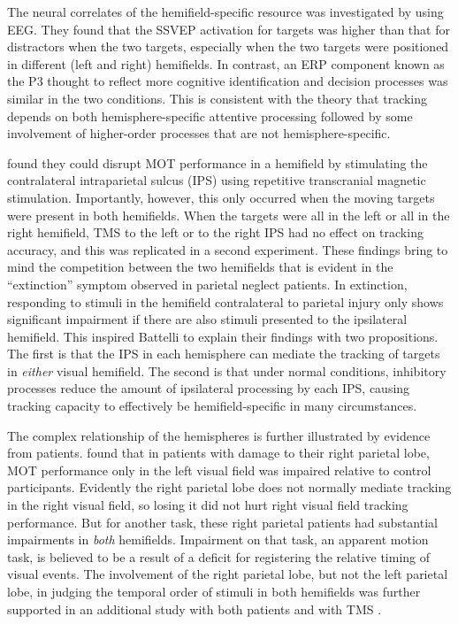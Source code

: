 \documentclass[
]{book}
\begin{document}
The neural correlates of the hemifield-specific resource was investigated by \citet{stormerWithinhemifieldCompetitionEarly2014} using EEG. They found that the SSVEP activation for targets was higher than that for distractors when the two targets, especially when the two targets were positioned in different (left and right) hemifields. In contrast, an ERP component known as the P3 thought to reflect more cognitive identification and decision processes was similar in the two conditions. This is consistent with the theory that tracking depends on both hemisphere-specific attentive processing followed by some involvement of higher-order processes that are not hemisphere-specific.

\citet{battelliRoleParietalLobe2009} found they could disrupt MOT performance in a hemifield by stimulating the contralateral intraparietal sulcus (IPS) using repetitive transcranial magnetic stimulation. Importantly, however, this only occurred when the moving targets were present in both hemifields. When the targets were all in the left or all in the right hemifield, TMS to the left or to the right IPS had no effect on tracking accuracy, and this was replicated in a second experiment. These findings bring to mind the competition between the two hemifields that is evident in the ``extinction'' symptom observed in parietal neglect patients. In extinction, responding to stimuli in the hemifield contralateral to parietal injury only shows significant impairment if there are also stimuli presented to the ipsilateral hemifield. This inspired Battelli to explain their findings with two propositions. The first is that the IPS in each hemisphere can mediate the tracking of targets in \emph{either} visual hemifield. The second is that under normal conditions, inhibitory processes reduce the amount of ipsilateral processing by each IPS, causing tracking capacity to effectively be hemifield-specific in many circumstances.

The complex relationship of the hemispheres is further illustrated by evidence from patients. \citet{battelliUnilateralRightParietal2001} found that in patients with damage to their right parietal lobe, MOT performance only in the left visual field was impaired relative to control participants. Evidently the right parietal lobe does not normally mediate tracking in the right visual field, so losing it did not hurt right visual field tracking performance. But for another task, these right parietal patients had substantial impairments in \emph{both} hemifields. Impairment on that task, an apparent motion task, is believed to be a result of a deficit for registering the relative timing of visual events. The involvement of the right parietal lobe, but not the left parietal lobe, in judging the temporal order of stimuli in both hemifields was further supported in an additional study with both patients and with TMS \citep{agostaPivotalRoleRight2017}.
\end{document}
